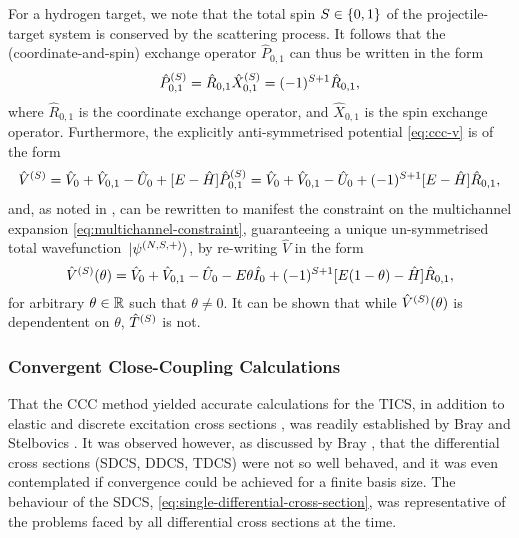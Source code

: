 \documentclass[draft]{article}
\begin{document}
For a hydrogen target, we note that the total spin $S \in \lbrace0, 1\rbrace$ of the
projectile-target system is conserved by the scattering process.
It follows that the (coordinate-and-spin) exchange operator $\hat{P}_{0, 1}$ can
thus be written in the form
\begin{equation}
  \label{eq:pairwise-exchange-hydrogen}
  \hat{P}_{0, 1}^{(S)}
  =
  \hat{R}_{0, 1}
  \hat{X}_{0, 1}^{(S)}
  =
  (-1)^{S + 1}
  \hat{R}_{0, 1}
  ,
\end{equation}
where $\hat{R}_{0, 1}$ is the coordinate exchange operator, and
$\hat{X}_{0, 1}$ is the spin exchange operator.
Furthermore, the explicitly anti-symmetrised potential \autoref{eq:ccc-v} is of
the form
\begin{equation}
  \label{eq:ccc-v-h}
  \hat{V}^{(S)}
  =
  \hat{V}_{0}
  +
  \hat{V}_{0, 1}
  -
  \hat{U}_{0}
  +
  [
    E
    -
    \hat{H}
  ]
  \hat{P}_{0, 1}^{(S)}
  =
  \hat{V}_{0}
  +
  \hat{V}_{0, 1}
  -
  \hat{U}_{0}
  +
  (-1)^{S + 1}
  [
    E
    -
    \hat{H}
  ]
  \hat{R}_{0, 1}
  ,
\end{equation}
and, as noted in \cite[5]{BRAY19951}, can be rewritten to manifest the
constraint on the multichannel expansion \autoref{eq:multichannel-constraint},
guaranteeing a unique un-symmetrised total wavefunction
$\ket*{\psi^{(N, S, +)}}$, by re-writing $\hat{V}$ in the form
\begin{equation}
  \label{eq:ccc-v-h-constraint}
  \hat{V}^{(S)}(\theta)
  =
  \hat{V}_{0}
  +
  \hat{V}_{0, 1}
  -
  \hat{U}_{0}
  -
  E
  \theta
  \hat{I}_{0}
  +
  (-1)^{S + 1}
  [
    E
    (1 - \theta)
    -
    \hat{H}
  ]
  \hat{R}_{0, 1}
  ,
\end{equation}
for arbitrary $\theta \in \mathbb{R}$ such that $\theta \neq 0$.
It can be shown that while $\hat{V}^{(S)}(\theta)$ is dependentent on
$\theta$, $\hat{T}^{(S)}$ is not.

\subsubsection{Convergent Close-Coupling Calculations}
\label{sec:e-h-ccc-calculations}

That the CCC method yielded accurate calculations for the TICS, in addition to
elastic and discrete excitation cross sections \cite{PhysRevA.46.6995}, was
readily established by Bray and Stelbovics \cite{PhysRevLett.70.746}.
It was observed however, as discussed by Bray \cite{PhysRevLett.78.4721}, that
the differential cross sections (SDCS, DDCS, TDCS) were not so well behaved, and
it was even contemplated if convergence could be achieved for a finite basis
size.
The behaviour of the SDCS, \autoref{eq:single-differential-cross-section}, was
representative of the problems faced by all differential cross sections at the
time.
\end{document}

